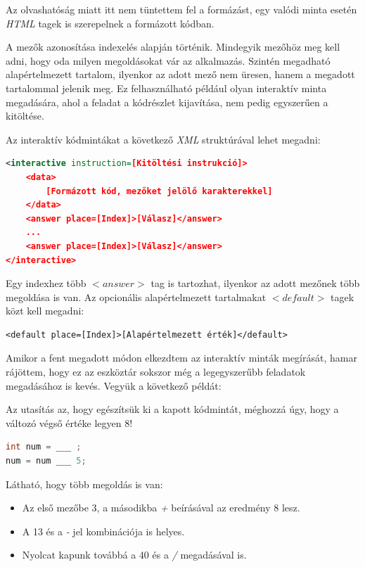\documentclass[12pt,a4paper]{article}
\newcommand{\xml}{\textit{XML}\xspace}
\begin{document}
	Az olvashatóság miatt itt nem tüntettem fel a formázást, egy valódi minta esetén \textit{HTML} tagek is szerepelnek a formázott kódban.
	
	A mezők azonosítása indexelés alapján történik. Mindegyik mezőhöz meg kell adni, hogy oda milyen megoldásokat vár az alkalmazás. Szintén megadható alapértelmezett tartalom, ilyenkor az adott mező nem üresen, hanem a megadott tartalommal jelenik meg. Ez felhasználható például olyan interaktív minta megadására, ahol a feladat a kódrészlet kijavítása, nem pedig egyszerűen a kitöltése.
	
	Az interaktív kódmintákat a következő \xml struktúrával lehet megadni:
	
	\bigskip
	\begin{lstlisting}[language=XML]
<interactive instruction=[Kitöltési instrukció]>
	<data>
		[Formázott kód, mezőket jelölő karakterekkel]
	</data>
	<answer place=[Index]>[Válasz]</answer>
	...
	<answer place=[Index]>[Válasz]</answer>
</interactive>
	\end{lstlisting}
	\bigskip
	
	Egy indexhez több $<answer>$ tag is tartozhat, ilyenkor az adott mezőnek több megoldása is van. Az opcionális alapértelmezett tartalmakat $<default>$ tagek közt kell megadni:
	
	\bigskip %
	\begin{lstlisting}
<default place=[Index]>[Alapértelmezett érték]</default>
	\end{lstlisting}
	\bigskip
	
	Amikor a fent megadott módon elkezdtem az interaktív minták megírását, hamar rájöttem, hogy ez az eszköztár sokszor még a legegyszerűbb feladatok megadásához is kevés. Vegyük a következő példát:
	
	Az utasítás az, hogy egészítsük ki a kapott kódmintát, méghozzá úgy, hogy a változó végső értéke legyen 8!
	
	\bigskip
	\begin{lstlisting}[language=Java]
int num = ___ ;
num = num ___ 5;
	\end{lstlisting}  
	\bigskip
	
	\noindent
	Látható, hogy több megoldás is van:
	
	\begin{itemize}
		\item Az első mezőbe 3, a másodikba \textit{+} beírásával az eredmény 8 lesz.
		\item A 13 és a \textit{-} jel kombinációja is helyes.
		\item Nyolcat kapunk továbbá a 40 és a \textit{/} megadásával is.
	\end{itemize}
	
\end{document}
